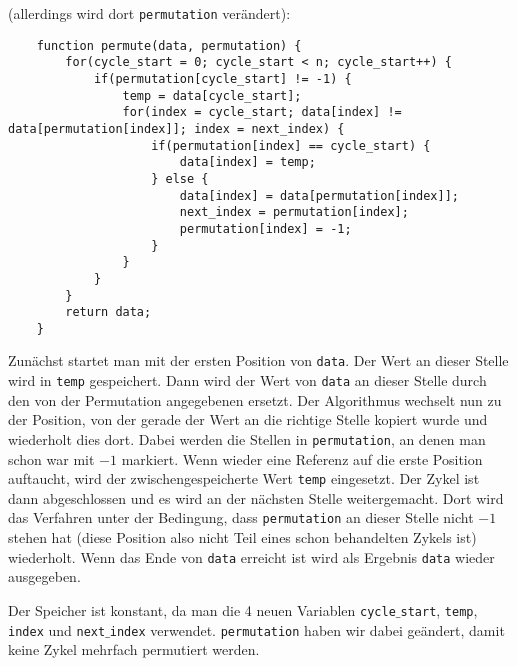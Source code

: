 \documentclass[11pt]{article}
\begin{document}
\begin{enumerate}[a)]
  (allerdings wird dort \texttt{permutation} verändert):
  \begin{lstlisting}
    function permute(data, permutation) {
        for(cycle_start = 0; cycle_start < n; cycle_start++) {
            if(permutation[cycle_start] != -1) {
                temp = data[cycle_start];
                for(index = cycle_start; data[index] != data[permutation[index]]; index = next_index) {
                    if(permutation[index] == cycle_start) {
                        data[index] = temp;
                    } else {
                        data[index] = data[permutation[index]];
                        next_index = permutation[index];
                        permutation[index] = -1;
                    }
                }
            }
        }
        return data;
    }
  \end{lstlisting}
  Zunächst startet man mit der ersten Position von \texttt{data}. Der Wert an
  dieser Stelle wird in \texttt{temp} gespeichert. Dann wird der Wert von
  \texttt{data} an dieser Stelle durch den von der Permutation angegebenen
  ersetzt. Der Algorithmus wechselt nun zu der Position, von der gerade der
  Wert an die richtige Stelle kopiert wurde und wiederholt dies dort. Dabei
  werden die Stellen in \texttt{permutation}, an denen man schon war mit $-1$
  markiert. Wenn wieder eine Referenz auf die erste Position auftaucht, wird
  der zwischengespeicherte Wert \texttt{temp} eingesetzt. Der Zykel ist dann
  abgeschlossen und es wird an der nächsten Stelle weitergemacht. Dort wird das
  Verfahren unter der Bedingung, dass \texttt{permutation} an dieser Stelle
  nicht $-1$ stehen hat (diese Position also nicht Teil eines schon behandelten
  Zykels ist) wiederholt. Wenn das Ende von \texttt{data} erreicht ist wird als
  Ergebnis \texttt{data} wieder ausgegeben.
  
  Der Speicher ist konstant, da man die 4 neuen Variablen
  \texttt{cycle$\_$start}, \texttt{temp}, \texttt{index} und
  \texttt{next$\_$index} verwendet. \texttt{permutation} haben wir dabei
  geändert, damit keine Zykel mehrfach permutiert werden.
\end{enumerate}
\end{document}
